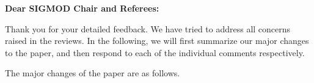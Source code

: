 
%

{\noindent \normalsize \bf Dear SIGMOD Chair and Referees: }

\vspace{1em}

Thank you for your detailed feedback.
We have tried to address all concerns raised in the reviews. 
In the following, we will first summarize our major changes to the paper, and then respond to each of the individual comments respectively.


\vspace{0.5em}
{\noindent The major changes of the paper are as follows.} %
